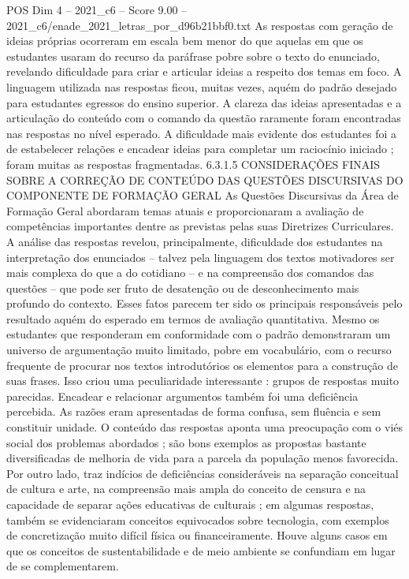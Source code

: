 \begin{textsample}{POS Dim 4 – 2021\_c6 – Score 9.00 – 2021\_c6/enade\_2021\_letras\_por\_d96b21bbf0.txt}
As respostas com geração de ideias próprias ocorreram em escala bem menor do que aquelas em que os estudantes usaram do recurso da paráfrase pobre sobre o texto do enunciado, revelando dificuldade para criar e articular ideias a respeito dos temas em foco.
A linguagem utilizada nas respostas ficou, muitas vezes, aquém do padrão desejado para estudantes egressos do ensino superior.
A clareza das ideias apresentadas e a articulação do conteúdo com o comando da questão raramente foram encontradas nas respostas no nível esperado.
A dificuldade mais evidente dos estudantes foi a de estabelecer relações e encadear ideias para completar um raciocínio iniciado ; foram muitas as respostas fragmentadas. 6.3.1.5 CONSIDERAÇÕES FINAIS SOBRE A CORREÇÃO DE CONTEÚDO DAS QUESTÕES DISCURSIVAS DO COMPONENTE DE FORMAÇÃO GERAL As Questões Discursivas da Área de Formação Geral abordaram temas atuais e proporcionaram a avaliação de competências importantes dentre as previstas pelas suas Diretrizes Curriculares.
A análise das respostas revelou, principalmente, dificuldade dos estudantes na interpretação dos enunciados – talvez pela linguagem dos textos motivadores ser mais complexa do que a do cotidiano – e na compreensão dos comandos das questões – que pode ser fruto de desatenção ou de desconhecimento mais profundo do contexto.
Esses fatos parecem ter sido os principais responsáveis pelo resultado aquém do esperado em termos de avaliação quantitativa.
Mesmo os estudantes que responderam em conformidade com o padrão demonstraram um universo de argumentação muito limitado, pobre em vocabulário, com o recurso frequente de procurar nos textos introdutórios os elementos para a construção de suas frases.
Isso criou uma peculiaridade interessante : grupos de respostas muito parecidas.
Encadear e relacionar argumentos também foi uma deficiência percebida.
As razões eram apresentadas de forma confusa, sem fluência e sem constituir unidade.
O conteúdo das respostas aponta uma preocupação com o viés social dos problemas abordados ; são bons exemplos as propostas bastante diversificadas de melhoria de vida para a parcela da população menos favorecida.
Por outro lado, traz indícios de deficiências consideráveis na separação conceitual de cultura e arte, na compreensão mais ampla do conceito de censura e na capacidade de separar ações educativas de culturais ; em algumas respostas, também se evidenciaram conceitos equivocados sobre tecnologia, com exemplos de concretização muito difícil física ou financeiramente.
Houve alguns casos em que os conceitos de sustentabilidade e de meio ambiente se confundiam em lugar de se complementarem.

\end{textsample}
